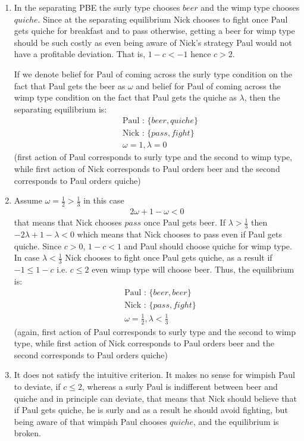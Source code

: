 \documentclass[a4paper]{article}
\begin{document}
\begin{enumerate}
	\item In the separating PBE the surly type chooses $beer$ and the wimp type chooses $quiche$. Since at the separating equilibrium Nick chooses to fight once Paul gets quiche for breakfast and to pass otherwise, getting a beer for wimp type should be such costly as even being aware of Nick's strategy Paul would not have a profitable deviation. That is, $1 - c < -1$ hence $c > 2$.
	
	If we denote belief for Paul of coming across the surly type condition on the fact that Paul gets the beer as $\omega$ and  belief for Paul of coming across the wimp type condition on the fact that Paul gets the quiche as $\lambda$, then the separating equilibrium is:
	\begin{align*}
	&\text{Paul : } \{beer, quiche\}\\
	&\text{Nick : } \{pass, fight\}\\
	& \omega = 1, \lambda = 0
	\end{align*}
	(first action of Paul corresponds to surly type and the second to wimp type, while first action of Nick corresponds to Paul orders beer and the second corresponds to Paul orders quiche)
	\item Assume $\omega = \frac{1}{2} > \frac{1}{3}$ in this case
	\begin{align*}
	2\omega + 1 - \omega < 0
	\end{align*}
	that means that Nick chooses $pass$ once Paul gets beer. If $\lambda > \frac{1}{3}$ then $-2\lambda + 1 - \lambda < 0$ which means that Nick chooses to pass even if Paul gets quiche. Since $c > 0$, $1 - c < 1$ and Paul should choose quiche for wimp type. In case $\lambda < \frac{1}{3}$ Nick chooses to fight once Paul gets quiche, as a result if $-1 \le 1 - c$ i.e. $c \le 2$ even wimp type will choose beer.
	Thus, the equilibrium is:
	\begin{align*}
	&\text{Paul : } \{beer, beer\}\\
	&\text{Nick : } \{pass, fight\}\\
	& \omega = \frac{1}{2}, \lambda < \frac{1}{3}
	\end{align*}
	(again, first action of Paul corresponds to surly type and the second to wimp type, while first action of Nick corresponds to Paul orders beer and the second corresponds to Paul orders quiche)
	\item It does not satisfy the intuitive criterion. It makes no sense for wimpish Paul to deviate, if $c \le 2$, whereas a surly Paul is indifferent between beer and quiche and in principle can deviate, that means that Nick should believe that if Paul gets quiche, he is surly and as a result he should avoid fighting, but being aware of that wimpish Paul chooses $quiche$, and the equilibrium is broken.
\end{enumerate}
\end{document}
